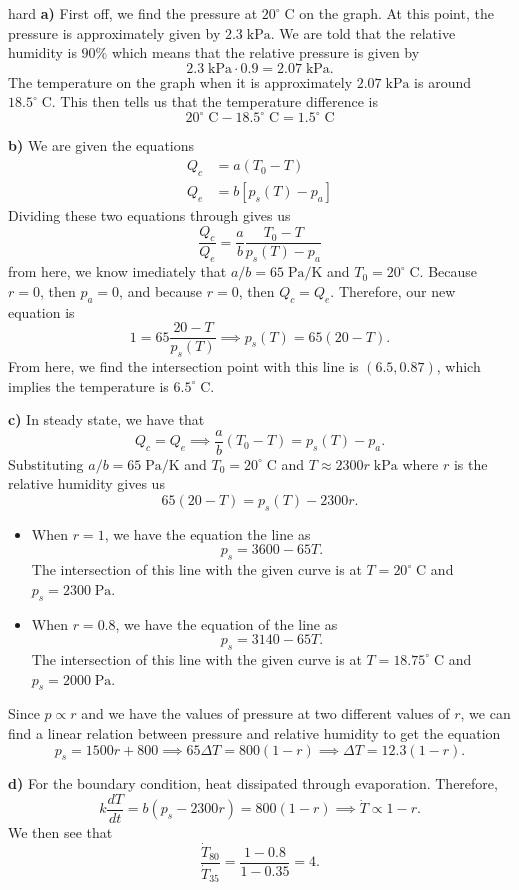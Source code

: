 \begin{solution}{hard} \textbf{a)} First off, we find the pressure at $20^\circ\;\mathrm{C}$ on the graph. At this point, the pressure is approximately given by $2.3\;\mathrm{kPa}$. We are told that the relative humidity is $90\%$ which means that the relative pressure is given by \[2.3\;\mathrm{kPa} \cdot 0.9 = 2.07\;\mathrm{kPa}.\]
The temperature on the graph when it is approximately $2.07\;\mathrm{kPa}$ is around $18.5^\circ\;\mathrm{C}$. This then tells us that the temperature difference is 
\[20^\circ\;\mathrm{C} - 18.5^\circ\;\mathrm{C} = \boxed{1.5^\circ\;\mathrm{C}}\]
\vspace{3mm}

\noindent \textbf{b)} We are given the equations
\begin{align*}
Q_c &= a(T_0 - T)\\
Q_e &= b[p_s(T) - p_a]
\end{align*}
Dividing these two equations through gives us 
\[\frac{Q_c}{Q_e} = \frac{a}{b}\frac{T_0 - T}{p_s (T) - p_a}\]
from here, we know imediately that $a/b = 65\;\mathrm{Pa/K}$ and $T_0 = 20^\circ\;\mathrm{C}$. Because $r = 0$, then $p_a = 0$, and because $r=0$, then $Q_c = Q_e$. Therefore, our new equation is
\[1 = 65\frac{20 - T}{p_s(T)}\implies p_s (T) = 65 (20 - T).\]
From here, we find the intersection point with this line is $(6.5, 0.87)$, which implies the temperature is $\boxed{6.5^\circ\;\mathrm{C}}$.
\vspace{3mm}

\noindent \textbf{c)} In steady state, we have that 
\[Q_c =Q_e\implies \frac{a}{b}(T_0 - T) = p_s(T) - p_a.\]
Substituting  $a/b = 65\;\mathrm{Pa/K}$ and $T_0 = 20^\circ\;\mathrm{C}$ and $T\approx 2300r\;\mathrm{kPa}$ where $r$ is the relative humidity gives us 
\[65 (20 - T) = p_s (T) - 2300r.\]
\begin{itemize}
\item When $r = 1$, we have the equation the line as
\[p_s = 3600 - 65T.\]
The intersection of this line with the given curve is at $T = 20^{\circ}\;\mathrm{C}$ and $p_s = 2300\;\mathrm{Pa}$.
\item When $r = 0.8$, we have the equation of the line as 
\[p_s = 3140 - 65T.\]
The intersection of this line with the given curve is at $T = 18.75^{\circ}\;\mathrm{C}$ and $p_s = 2000\;\mathrm{Pa}$.
\end{itemize}
Since $p\propto r$ and we have the values of pressure at two different values of $r$, we can find a linear relation between pressure and relative humidity to get the equation
\[p_s = 1500r + 800\implies 65\Delta T = 800 (1 - r)\implies \Delta T = \boxed{12.3 (1 - r)}.\]
\vspace{3mm}

\noindent \textbf{d)} For the boundary condition, heat dissipated through evaporation. Therefore, 
\[k\frac{dT}{dt} = b(p_s - 2300r) = 800(1 - r) \implies \dot{T}\propto 1 - r.\]
We then see that 
\[\frac{\dot{T}_{80}}{\dot{T}_{35}} = \frac{1 - 0.8}{1 - 0.35} = \boxed{4}.\]
\end{solution}